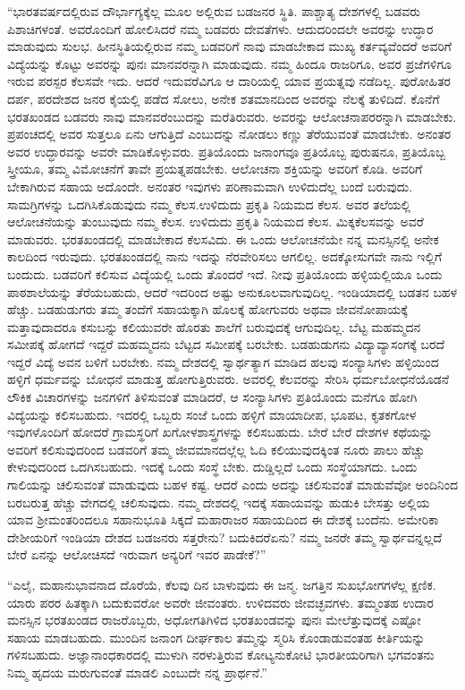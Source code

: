  “ಭಾರತವರ್ಷದಲ್ಲಿರುವ ದೌರ್ಭಾಗ್ಯಕ್ಕೆಲ್ಲ ಮೂಲ ಅಲ್ಲಿರುವ ಬಡಜನರ ಸ್ಥಿತಿ. ಪಾಶ್ಚಾತ್ಯ ದೇಶಗಳಲ್ಲಿ ಬಡವರು ಪಿಶಾಚಿಗಳಂತೆ. ಅವರೊಂದಿಗೆ ಹೋಲಿಸಿದರೆ ನಮ್ಮ ಬಡವರು ದೇವತೆಗಳು. ಆದುದರಿಂದಲೇ ಅವರನ್ನು ಉದ್ಧಾರ ಮಾಡುವುದು ಸುಲಭ. ಹೀನಸ್ಥಿತಿಯಲ್ಲಿರುವ ನಮ್ಮ ಬಡವರಿಗೆ ನಾವು ಮಾಡಬೇಕಾದ ಮುಖ್ಯ ಕರ್ತವ್ಯವೆಂದರೆ ಅವರಿಗೆ ವಿದ್ಯೆಯನ್ನು ಕೊಟ್ಟು ಅವರನ್ನು ಪುನಃ ಮಾನವರನ್ನಾಗಿ ಮಾಡುವುದು. ನಮ್ಮ ಹಿಂದೂ ರಾಜರಿಗೂ, ಅವರ ಪ್ರಜೆಗಳಿಗೂ ಇರುವ ಪರಸ್ಪರ ಕೆಲಸವೇ ಇದು. ಆದರೆ ಇದುವರೆವಿಗೂ ಆ ದಾರಿಯಲ್ಲಿ ಯಾವ ಪ್ರಯತ್ನವು ನಡೆದಿಲ್ಲ. ಪುರೋಹಿತರ ದರ್ಪ, ಪರದೇಶದ ಜನರ ಕೈಯಲ್ಲಿ ಪಡೆದ ಸೋಲು, ಅನೇಕ ಶತಮಾನದಿಂದ ಅವರನ್ನು ನೆಲಕ್ಕೆ ತುಳಿದಿದೆ. ಕೊನೆಗೆ ಭರತಖಂಡದ ಬಡವರು ನಾವು ಮಾನವರೆಂಬುದನ್ನು ಮರೆತಿರುವರು. ಅವರನ್ನು ಆಲೋಚನಾಪರರನ್ನಾಗಿ ಮಾಡಬೇಕು. ಪ್ರಪಂಚದಲ್ಲಿ ಅವರ ಸುತ್ತಲೂ ಏನು ಆಗುತ್ತಿದೆ ಎಂಬುದನ್ನು ನೋಡಲು ಕಣ್ಣು ತೆರೆಯುವಂತೆ ಮಾಡಬೇಕು. ಅನಂತರ ಅವರ ಉದ್ಧಾರವನ್ನು ಅವರೇ ಮಾಡಿಕೊಳ್ಳುವರು. ಪ್ರತಿಯೊಂದು ಜನಾಂಗವೂ ಪ್ರತಿಯೊಬ್ಬ ಪುರುಷನೂ, ಪ್ರತಿಯೊಬ್ಬ ಸ್ತ್ರೀಯೂ, ತಮ್ಮ ವಿಮೋಚನೆಗೆ ತಾವೇ ಪ್ರಯತ್ನಪಡಬೇಕು. ಆಲೋಚನಾ ಶಕ್ತಿಯನ್ನು ಅವರಿಗೆ ಕೊಡಿ. ಅವರಿಗೆ ಬೇಕಾಗಿರುವ ಸಹಾಯ ಅದೊಂದೇ. ಅನಂತರ ಇವುಗಳು ಪರಿಣಾಮವಾಗಿ ಉಳಿದುದೆಲ್ಲ ಬಂದೆ ಬರುವುದು. ಸಾಮಗ್ರಿಗಳನ್ನು ಒದಗಿಸಿಕೊಡುವುದು ನಮ್ಮ ಕೆಲಸ.\break ಉಳಿದುದು ಪ್ರಕೃತಿ ನಿಯಮದ ಕೆಲಸ. ಅವರ ತಲೆಯಲ್ಲಿ ಆಲೋಚನೆಯನ್ನು ತುಂಬುವುದು ನಮ್ಮ ಕೆಲಸ. ಉಳಿದುದು ಪ್ರಕೃತಿ ನಿಯಮದ ಕೆಲಸ. ಮಿಕ್ಕಕೆಲಸವನ್ನು ಅವರೆ ಮಾಡುವರು. ಭರತಖಂಡದಲ್ಲಿ ಮಾಡಬೇಕಾದ ಕೆಲಸವಿದು. ಈ ಒಂದು ಆಲೋಚನೆಯೇ ನನ್ನ ಮನಸ್ಸಿನಲ್ಲಿ ಅನೇಕ ಕಾಲದಿಂದ ಇರುವುದು. ಭರತಖಂಡದಲ್ಲಿ ನಾನು ಇದನ್ನು ನೆರವೇರಿಸಲು ಆಗಲಿಲ್ಲ. ಅದಕ್ಕೋಸುಗವೇ ನಾನು ಇಲ್ಲಿಗೆ ಬಂದುದು. ಬಡವರಿಗೆ ಕಲಿಸುವ ವಿದ್ಯೆಯಲ್ಲಿ ಒಂದು ತೊಂದರೆ ಇದೆ. ನೀವು ಪ್ರತಿಯೊಂದು ಹಳ್ಳಿಯಲ್ಲಿಯೂ ಒಂದು ಪಾಠಶಾಲೆಯನ್ನು ತೆರೆಯಬಹುದು, ಆದರೆ ಇದರಿಂದ ಅಷ್ಟು ಅನುಕೂಲವಾಗುವುದಿಲ್ಲ. ಇಂಡಿಯಾದಲ್ಲಿ ಬಡತನ ಬಹಳ ಹೆಚ್ಚು. ಬಡಹುಡುಗರು ತಮ್ಮ ತಂದೆಗೆ ಸಹಾಯಕ್ಕಾಗಿ ಹೊಲಕ್ಕೆ ಹೋಗುವರು ಅಥವಾ ಜೀವನೋಪಾಯಕ್ಕೆ ಮತ್ತಾವುದಾದರೂ ಕಸುಬನ್ನು ಕಲಿಯುವರೇ ಹೊರತು ಶಾಲೆಗೆ ಬರುವುದಕ್ಕೆ ಆಗುವುದಿಲ್ಲ. ಬೆಟ್ಟ ಮಹಮ್ಮದನ ಸಮೀಪಕ್ಕೆ ಹೋಗದೆ ಇದ್ದರೆ ಮಹಮ್ಮದನು ಬೆಟ್ಟದ ಸಮೀಪಕ್ಕೆ ಬರಬೇಕು. ಬಡಹುಡುಗನು ವಿದ್ಯಾವ್ಯಾಸಂಗಕ್ಕೆ ಬರದೆ ಇದ್ದರೆ ವಿದ್ಯೆ ಅವನ ಬಳಿಗೆ ಬರಬೇಕು. ನಮ್ಮ ದೇಶದಲ್ಲಿ ಸ್ವಾರ್ಥತ್ಯಾಗ ಮಾಡಿದ ಹಲವು ಸಂನ್ಯಾಸಿಗಳು ಹಳ್ಳಿಯಿಂದ ಹಳ್ಳಿಗೆ ಧರ್ಮವನ್ನು ಬೋಧನೆ ಮಾಡುತ್ತ ಹೋಗುತ್ತಿರುವರು. ಅವರಲ್ಲಿ ಕೆಲವರನ್ನು ಸೇರಿಸಿ ಧರ್ಮಬೋಧನೆಯೊಡನೆ ಲೌಕಿಕ ವಿಚಾರಗಳನ್ನು ಜನಗಳಿಗೆ ತಿಳಿಸುವಂತೆ ಮಾಡಿದರೆ, ಆ ಸಂನ್ಯಾಸಿಗಳು ಪ್ರತಿಯೊಂದು ಮನೆಗೂ ಹೋಗಿ ವಿದ್ಯೆಯನ್ನು ಕಲಿಸಬಹುದು. ಇದರಲ್ಲಿ ಒಬ್ಬರು ಸಂಜೆ ಒಂದು ಹಳ್ಳಿಗೆ ಮಾಯಾದೀಪ, ಭೂಪಟ, ಕೃತಕಗೋಳ ಇವುಗಳೊಂದಿಗೆ ಹೋದರೆ ಗ್ರಾಮಸ್ಥರಿಗೆ ಖಗೋಳಶಾಸ್ತ್ರಗಳನ್ನು ಕಲಿಸಬಹುದು. ಬೇರೆ ಬೇರೆ ದೇಶಗಳ ಕಥೆಯನ್ನು ಅವರಿಗೆ ಕಲಿಸುವುದರಿಂದ ಬಡವರಿಗೆ ತಮ್ಮ ಜೀವಮಾನದಲ್ಲೆಲ್ಲ ಓದಿ ಕಲಿಯುವುದಕ್ಕಿಂತ ನೂರು ಪಾಲು ಹೆಚ್ಚು ಕೇಳುವುದರಿಂದ ಒದಗಿಸಬಹುದು. ಇದಕ್ಕೆ ಒಂದು ಸಂಸ್ಥೆ ಬೇಕು. ದುಡ್ಡಿಲ್ಲದೆ ಒಂದು ಸಂಸ್ಥೆಯಾಗದು. ಒಂದು ಗಾಲಿಯನ್ನು ಚಲಿಸುವಂತೆ ಮಾಡುವುದು ಬಹಳ ಕಷ್ಟ. ಆದರೆ ಎಂದು ಅದನ್ನು ಚಲಿಸುವಂತೆ ಮಾಡುವೆವೋ ಅಂದಿನಿಂದ ಬರಬರುತ್ತ ಹೆಚ್ಚು ವೇಗದಲ್ಲಿ ಚಲಿಸುವುದು. ನಮ್ಮ ದೇಶದಲ್ಲಿ ಇದಕ್ಕೆ ಸಹಾಯವನ್ನು ಹುಡುಕಿ ಬೇಸತ್ತು ಅಲ್ಲಿಯ ಯಾವ ಶ‍್ರೀಮಂತರಿಂದಲೂ ಸಹಾನುಭೂತಿ ಸಿಕ್ಕದೆ ಮಹಾರಾಜರ ಸಹಾಯದಿಂದ ಈ ದೇಶಕ್ಕೆ ಬಂದೆನು. ಅಮೇರಿಕಾ ದೇಶೀಯರಿಗೆ ಇಂಡಿಯಾ ದೇಶದ ಬಡಜನರು ಸತ್ತರೇನು? ಬದುಕಿದರೆಏನು? ನಮ್ಮ ಜನರೇ ತಮ್ಮ ಸ್ವಾರ್ಥವನ್ನಲ್ಲದೆ ಬೇರೆ ಏನನ್ನು ಆಲೋಚಿಸದೆ ಇರುವಾಗ ಅನ್ಯರಿಗೆ ಇವರ ಪಾಡೇಕೆ?” 

 “ಎಲೈ, ಮಹಾನುಭಾವನಾದ ದೊರೆಯೆ, ಕೆಲವು ದಿನ ಬಾಳುವುದು ಈ ಜನ್ಮ. ಜಗತ್ತಿನ ಸುಖಭೋಗಗಳೆಲ್ಲ ಕ್ಷಣಿಕ. ಯಾರು ಪರರ ಹಿತಕ್ಕಾಗಿ ಬದುಕುವರೋ ಅವರೇ ಜೀವಂತರು. ಉಳಿದವರು ಜೀವಚ್ಛವಗಳು. ತಮ್ಮಂತಹ ಉದಾರ ಮನಸ್ಸಿನ ಭರತಖಂಡದ ರಾಜರೊಬ್ಬರು, ಅಧೋಗತಿಗಿಳಿದ ಭರತಖಂಡವನ್ನು ಪುನಃ ಮೇಲೆತ್ತುವುದಕ್ಕೆ ಎಷ್ಟೋ ಸಹಾಯ ಮಾಡಬಹುದು. ಮುಂದಿನ ಜನಾಂಗ ದೀರ್ಘಕಾಲ ತಮ್ಮನ್ನು ಸ್ಮರಿಸಿ ಕೊಂಡಾಡುವಂತಹ ಕೀರ್ತಿಯನ್ನು ಗಳಿಸಬಹುದು. ಅಜ್ಞಾನಾಂಧಕಾರದಲ್ಲಿ ಮುಳುಗಿ ನರಳುತ್ತಿರುವ ಕೋಟ್ಯನುಕೋಟಿ ಭಾರತೀಯರಿಗಾಗಿ ಭಗವಂತನು ನಿಮ್ಮ ಹೃದಯ ಮರುಗುವಂತೆ ಮಾಡಲಿ ಎಂಬುದೇ ನನ್ನ ಪ್ರಾರ್ಥನೆ.” 

